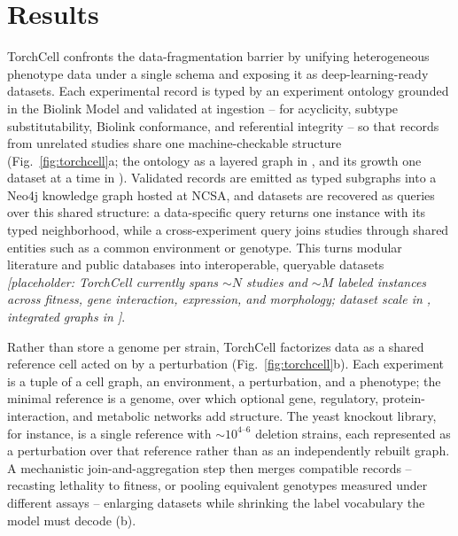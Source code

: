 \section{Results}\label{sec:results}

TorchCell confronts the data-fragmentation barrier by unifying heterogeneous phenotype
data under a single schema and exposing it as deep-learning-ready datasets. Each
experimental record is typed by an experiment ontology grounded in the Biolink Model and
validated at ingestion -- for acyclicity, subtype substitutability, Biolink conformance,
and referential integrity -- so that records from unrelated studies share one
machine-checkable structure (Fig.~\ref{fig:torchcell}a; the ontology as a layered graph in
, and its growth one dataset at a time in ). Validated records are emitted as typed
subgraphs into a Neo4j knowledge graph hosted at NCSA, and datasets are recovered as
queries over this shared structure: a data-specific query returns one instance with its
typed neighborhood, while a cross-experiment query joins studies through shared entities
such as a common environment or genotype. This turns modular literature and public
databases into interoperable, queryable datasets
\textit{[placeholder: TorchCell currently spans ${\sim}N$ studies and ${\sim}M$ labeled
instances across fitness, gene interaction, expression, and morphology; dataset scale in
, integrated graphs in
]}.

Rather than store a genome per strain, TorchCell factorizes data as a shared reference
cell acted on by a perturbation (Fig.~\ref{fig:torchcell}b). Each experiment is a tuple of
a cell graph, an environment, a perturbation, and a phenotype; the minimal reference is a
genome, over which optional gene, regulatory, protein-interaction, and metabolic networks
add structure. The yeast knockout library, for instance, is a single reference with
${\sim}10^{4\text{--}6}$ deletion strains, each represented as a perturbation over that
reference rather than as an independently rebuilt graph. A mechanistic join-and-aggregation
step then merges compatible records -- recasting lethality to fitness, or pooling
equivalent genotypes measured under different assays -- enlarging datasets while shrinking
the label vocabulary the model must decode (b).

